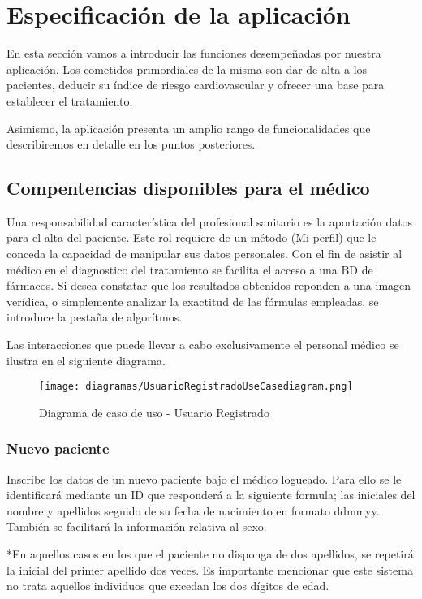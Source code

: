 \documentclass[11pt,spanish,
		listoftables,listoffigures]
		{tfgplantilla}
\begin{document}
\chapter{Especificación de la aplicaci\'on}

En esta sección vamos a introducir las funciones desempeñadas por nuestra aplicación. Los cometidos primordiales de la misma son dar de alta a los pacientes, deducir su índice de riesgo cardiovascular y ofrecer una base para establecer el tratamiento.

Asimismo, la aplicación presenta un amplio rango de funcionalidades que describiremos en detalle en los puntos posteriores.

\section {Compentencias disponibles para el médico}
Una responsabilidad característica del profesional sanitario es la aportación datos para el alta del paciente. Este rol requiere de un método (Mi perfil) que le conceda la capacidad de manipular sus datos personales.
Con el fin de asistir al médico en el diagnostico del tratamiento se facilita el acceso a una BD de fármacos. Si desea constatar que los resultados obtenidos reponden a una imagen verídica, o simplemente analizar la exactitud de las fórmulas empleadas, se introduce la pestaña de algorítmos.

Las interacciones que puede llevar a cabo exclusivamente el personal médico se ilustra en el siguiente diagrama.

\begin{figure}[H]
\centering
\texttt{[image: diagramas/UsuarioRegistradoUseCasediagram.png]}
\caption{Diagrama de caso de uso - Usuario Registrado}
\end{figure}

\subsection {Nuevo paciente}

Inscribe los datos de un nuevo paciente bajo el médico logueado. Para ello se le identificará mediante un ID que responderá a la siguiente formula; las iniciales del nombre y apellidos seguido de su fecha de nacimiento en formato ddmmyy. También se facilitará la información relativa al sexo.

*En aquellos casos en los que el paciente no disponga de dos apellidos, se repetirá la inicial del primer apellido dos veces. Es importante mencionar que este sistema no trata aquellos individuos que excedan los dos dígitos de edad.
\end{document}
